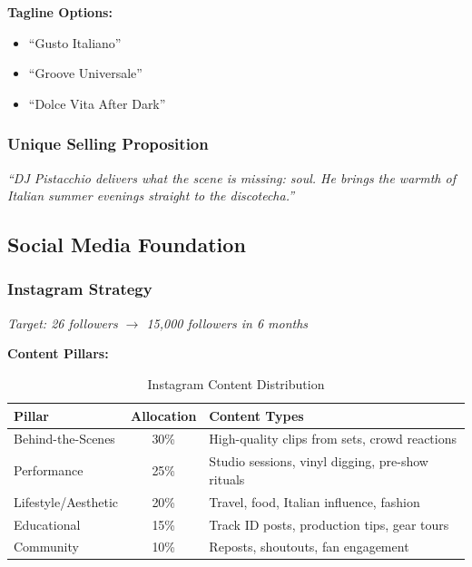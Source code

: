 \documentclass[11pt,a4paper]{article}
\begin{document}
\begin{highlightbox}
\textbf{Tagline Options:}
\begin{itemize}[leftmargin=*,topsep=0pt]
    \item ``Gusto Italiano''
    \item ``Groove Universale''
    \item ``Dolce Vita After Dark''
\end{itemize}
\end{highlightbox}

\subsubsection{Unique Selling Proposition}

\begin{quotebox}
\textit{``DJ Pistacchio delivers what the scene is missing: soul. He brings the warmth of Italian summer evenings straight to the discotecha.''}
\end{quotebox}

\subsection{Social Media Foundation}

\subsubsection{Instagram Strategy}
\textit{Target: 26 followers $\rightarrow$ 15,000 followers in 6 months}

\vspace{0.5em}
\noindent\textbf{Content Pillars:}

\begin{table}[h!]
\centering
\renewcommand{\arraystretch}{1.3}
\begin{tabularx}{\textwidth}{l c X}
\toprule
\rowcolor{amaraprimary}
\textcolor{amaracream}{\textbf{Pillar}} & \textcolor{amaracream}{\textbf{Allocation}} & \textcolor{amaracream}{\textbf{Content Types}} \\
\midrule
Behind-the-Scenes & 30\% & High-quality clips from sets, crowd reactions \\
Performance & 25\% & Studio sessions, vinyl digging, pre-show rituals \\
Lifestyle/Aesthetic & 20\% & Travel, food, Italian influence, fashion \\
Educational & 15\% & Track ID posts, production tips, gear tours \\
Community & 10\% & Reposts, shoutouts, fan engagement \\
\bottomrule
\end{tabularx}
\caption{Instagram Content Distribution}
\end{table}
\end{document}
